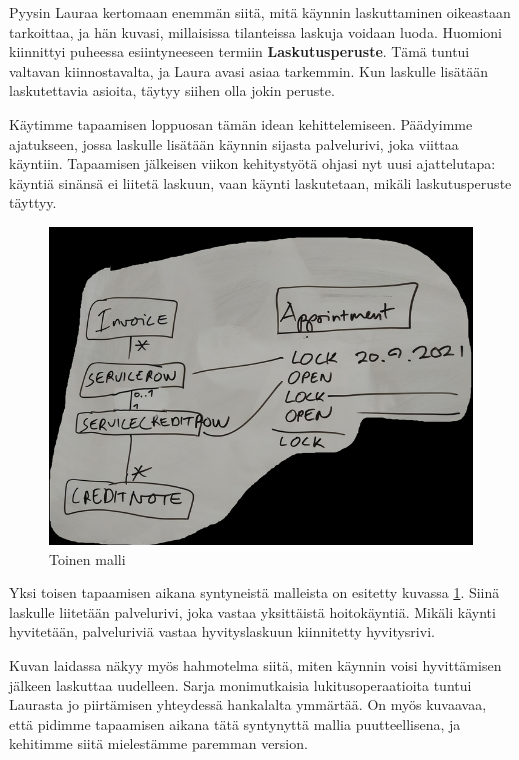 Pyysin Lauraa kertomaan enemmän siitä, mitä käynnin laskuttaminen
oikeastaan tarkoittaa, ja hän kuvasi, millaisissa tilanteissa laskuja
voidaan luoda. Huomioni kiinnittyi puheessa esiintyneeseen termiin
\textbf{Laskutusperuste}. Tämä tuntui valtavan kiinnostavalta, ja Laura
avasi asiaa tarkemmin. Kun laskulle lisätään laskutettavia asioita,
täytyy siihen olla jokin peruste.

Käytimme tapaamisen loppuosan tämän idean kehittelemiseen. Päädyimme
ajatukseen, jossa laskulle lisätään käynnin sijasta palvelurivi, joka
viittaa käyntiin. Tapaamisen jälkeisen viikon kehitystyötä ohjasi nyt
uusi ajattelutapa: käyntiä sinänsä ei liitetä laskuun, vaan käynti
laskutetaan, mikäli laskutusperuste täyttyy.

\begin{figure}
\centering
\includegraphics{illustration/malli2.jpg}
\caption{\label{malli2}Toinen malli}
\end{figure}

Yksi toisen tapaamisen aikana syntyneistä malleista on esitetty kuvassa
\ref{malli2}. Siinä laskulle liitetään palvelurivi, joka vastaa
yksittäistä hoitokäyntiä. Mikäli käynti hyvitetään, palveluriviä vastaa
hyvityslaskuun kiinnitetty hyvitysrivi.

Kuvan laidassa näkyy myös hahmotelma siitä, miten käynnin voisi
hyvittämisen jälkeen laskuttaa uudelleen. Sarja monimutkaisia
lukitusoperaatioita tuntui Laurasta jo piirtämisen yhteydessä hankalalta
ymmärtää. On myös kuvaavaa, että pidimme tapaamisen aikana tätä
syntynyttä mallia puutteellisena, ja kehitimme siitä mielestämme
paremman version.

